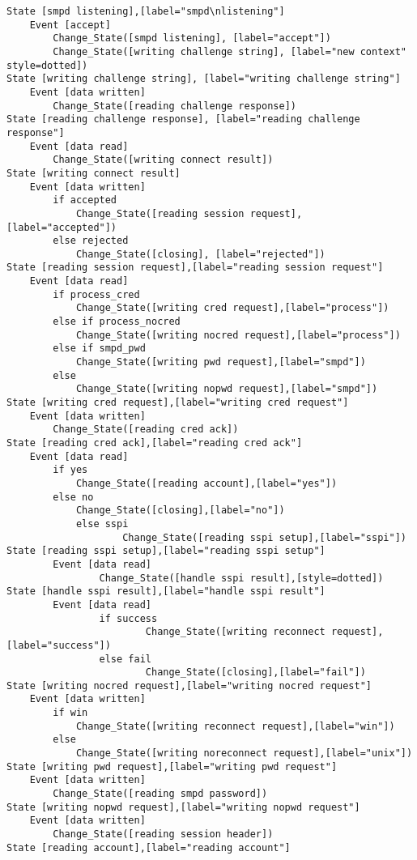 \begin{comment}
This is the state machine for the smpd listener process.
Graph [smpd listener],
      [size="7.5, 10"]
\end{comment}
\begin{verbatim}
State [smpd listening],[label="smpd\nlistening"]
	Event [accept]
		Change_State([smpd listening], [label="accept"])
		Change_State([writing challenge string], [label="new context" style=dotted])
State [writing challenge string], [label="writing challenge string"]
	Event [data written]
		Change_State([reading challenge response])
State [reading challenge response], [label="reading challenge response"]
	Event [data read]
		Change_State([writing connect result])
State [writing connect result]
	Event [data written]
		if accepted
			Change_State([reading session request], [label="accepted"])
		else rejected
			Change_State([closing], [label="rejected"])
State [reading session request],[label="reading session request"]
	Event [data read]
		if process_cred
			Change_State([writing cred request],[label="process"])
		else if process_nocred
			Change_State([writing nocred request],[label="process"])
		else if smpd_pwd
			Change_State([writing pwd request],[label="smpd"])
		else
			Change_State([writing nopwd request],[label="smpd"])
State [writing cred request],[label="writing cred request"]
	Event [data written]
		Change_State([reading cred ack])
State [reading cred ack],[label="reading cred ack"]
	Event [data read]
		if yes
			Change_State([reading account],[label="yes"])
		else no
			Change_State([closing],[label="no"])
	        else sspi
	                Change_State([reading sspi setup],[label="sspi"])
State [reading sspi setup],[label="reading sspi setup"]
        Event [data read]
                Change_State([handle sspi result],[style=dotted])
State [handle sspi result],[label="handle sspi result"]
        Event [data read]
                if success
                        Change_State([writing reconnect request],[label="success"])
                else fail
                        Change_State([closing],[label="fail"])
State [writing nocred request],[label="writing nocred request"]
	Event [data written]
		if win
			Change_State([writing reconnect request],[label="win"])
		else
			Change_State([writing noreconnect request],[label="unix"])
State [writing pwd request],[label="writing pwd request"]
	Event [data written]
		Change_State([reading smpd password])
State [writing nopwd request],[label="writing nopwd request"]
	Event [data written]
		Change_State([reading session header])
State [reading account],[label="reading account"]

\end{verbatim}
